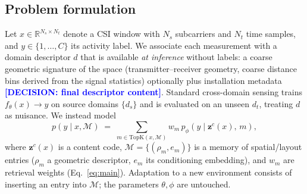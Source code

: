 \documentclass[conference]{IEEEtran}
\newcommand{\DECISION}[1]{\textcolor{blue}{\textbf{[DECISION: #1]}}}
\newcommand{\zc}{\mathbf{z}^{c}}      %
\begin{document}
\subsection{Problem formulation}
Let $x\in\mathbb{R}^{N_s\times N_t}$ denote a CSI window with $N_s$ subcarriers and $N_t$
time samples, and $y\in\{1,\dots,C\}$ its activity label. We associate each measurement
with a domain descriptor $d$ that is available \emph{at inference} without labels: a coarse
geometric signature of the space (transmitter--receiver geometry, coarse distance bins
derived from the signal statistics) optionally plus installation metadata
\DECISION{final descriptor content}. Standard cross-domain sensing trains
$f_\theta(x)\!\to\!y$ on source domains $\{d_s\}$ and is evaluated on an unseen $d_t$,
treating $d$ as nuisance. We instead model
\begin{equation}
p(y\mid x, \mathcal{M}) \;=\; \sum_{m \in \mathrm{TopK}(x,\mathcal{M})} w_m \, p_\phi\!\left(y \mid \zc(x),\, m\right),
\label{eq:main}
\end{equation}
where $\zc(x)$ is a content code, $\mathcal{M}=\{(\rho_m, e_m)\}$ is a memory of
spatial/layout entries ($\rho_m$ a geometric descriptor, $e_m$ its conditioning embedding),
and $w_m$ are retrieval weights (Eq.~\eqref{eq:main}). Adaptation to a new environment
consists of inserting an entry into $\mathcal{M}$; the parameters $\theta,\phi$ are untouched.
\end{document}

